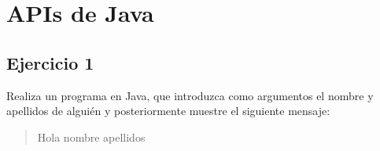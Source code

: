 \documentclass[4paper]{article}
\begin{document}

\section{APIs de Java}

\subsection{Ejercicio 1}
Realiza un programa en Java, que introduzca como argumentos el nombre y apellidos de alguién y posteriormente muestre el siguiente mensaje:
\begin{quote}
Hola nombre apellidos
\end{quote}
\end{document}

